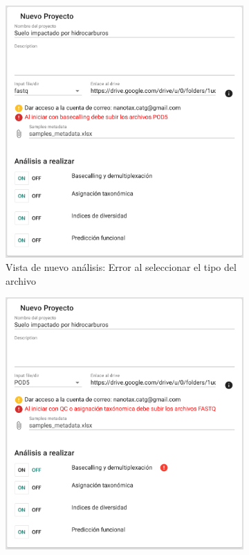 \begin{figure}[H]
    \centering
    \begin{subfigure}[b]{0.45\textwidth}
        \centering
        \includegraphics[width=\textwidth]{images/app/newAnalysis/pod5-error.png}
        \caption{Vista de nuevo análisis: Error al seleccionar el tipo del archivo}
        \label{fig:app-new-analysis-pod5-error}
    \end{subfigure}
    \hfill
    \begin{subfigure}[b]{0.45\textwidth}
        \centering
        \includegraphics[width=\textwidth]{images/app/newAnalysis/fastq.png}

\end{subfigure}
\end{figure}

